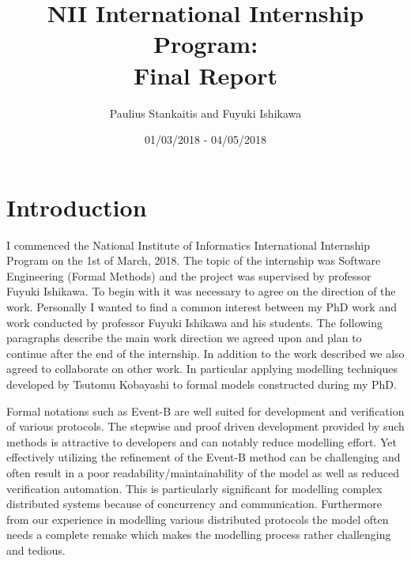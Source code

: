 \documentclass{llncs}
\begin{document}
	\title{NII International Internship Program: \vspace{.2cm} \\ Final Report}
	
	\author{Paulius Stankaitis and Fuyuki Ishikawa}
		\date{01/03/2018 - 04/05/2018}
	\maketitle

		
		\setcounter{footnote}{0}
		
		\section*{Introduction}
		I commenced the National Institute of Informatics International Internship Program on the 1st of March, 2018. The topic of the internship was Software Engineering (Formal Methods) and the project was supervised by professor Fuyuki Ishikawa. To begin with it was necessary to agree on the direction of the work. Personally I wanted to find a common interest between my PhD work and work conducted by professor Fuyuki Ishikawa and his students. The following paragraphs describe the main work direction we agreed upon and plan to continue after the end of the internship. In addition to the work described we also agreed to collaborate on other work. In particular applying modelling techniques developed by Tsutomu Kobayashi to formal models constructed during my PhD.
		
		Formal notations such as Event-B \cite{EventBBook} are well suited for development and verification of various protocols. The stepwise and proof driven development provided by such methods is attractive to developers and can notably reduce modelling effort. Yet effectively utilizing the refinement of the Event-B method can be challenging and often result in a poor readability/maintainability of the model as well as reduced verification automation. This is particularly significant for modelling complex distributed systems because of concurrency and communication. Furthermore from our experience in modelling various distributed protocols the model often needs a complete remake which makes the modelling process rather challenging and tedious.
		
\end{document}
